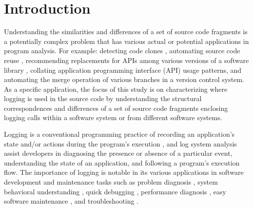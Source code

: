 
\chapter{Introduction}  \label{Introduction}

Understanding the similarities and differences of a set of source code fragments is a potentially complex problem that has various actual or potential applications in program analysis. For example: detecting code clones \cite{bulychev2009evaluation}, automating source code reuse \cite{2008:fse:cottrell}, recommending replacements for APIs among various versions of a software library \cite{2014:uofc:cossette}, collating application programming interface (API) usage patterns, and automating the merge operation of various branches in a version control system. As a specific application, the focus of this study is on characterizing where logging is used in the source code by understanding the structural correspondences and differences of a set of source code fragments enclosing logging calls within a software system or from different software systems.

Logging is a conventional programming practice of recording an application's state and/or actions during the program's execution \cite{gupta2005pro}, and log system analysis assist developers in diagnosing the presence or absence of a particular event,  understanding the state of an application, and following a program's execution flow. The importance of logging is notable in its various applications in software development and maintenance tasks such as problem diagnosis \cite{lou2010mining}, system behavioral understanding \cite{fu2013contextual}, quick debugging \cite{gupta2005pro}, performance diagnosis \cite{nagaraj2012structured}, easy software maintenance \cite{gupta2005pro}, and troubleshooting \cite{fu2009execution}.

